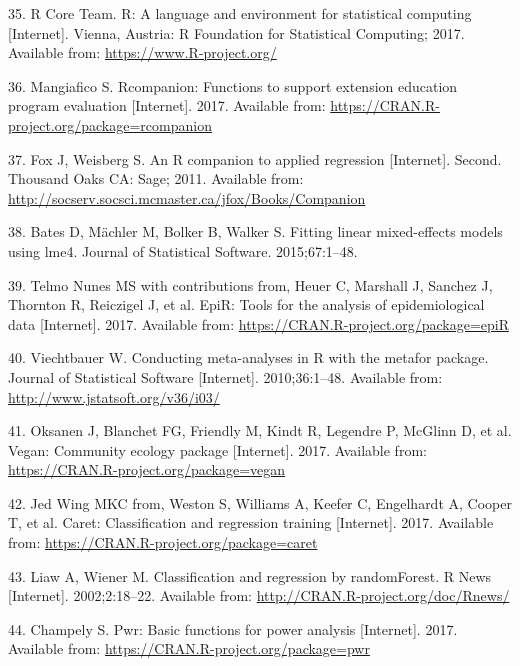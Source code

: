 \documentclass[12pt,]{article}
\begin{document}
\hypertarget{ref-r_citation_2017}{}
35. R Core Team. R: A language and environment for statistical computing
{[}Internet{]}. Vienna, Austria: R Foundation for Statistical Computing;
2017. Available from: \url{https://www.R-project.org/}

\hypertarget{ref-rcompanion_citation_2017}{}
36. Mangiafico S. Rcompanion: Functions to support extension education
program evaluation {[}Internet{]}. 2017. Available from:
\url{https://CRAN.R-project.org/package=rcompanion}

\hypertarget{ref-car_citation_2011}{}
37. Fox J, Weisberg S. An R companion to applied regression
{[}Internet{]}. Second. Thousand Oaks CA: Sage; 2011. Available from:
\url{http://socserv.socsci.mcmaster.ca/jfox/Books/Companion}

\hypertarget{ref-lme4_citation_2015}{}
38. Bates D, Mächler M, Bolker B, Walker S. Fitting linear mixed-effects
models using lme4. Journal of Statistical Software. 2015;67:1--48.

\hypertarget{ref-epir_citation_2017}{}
39. Telmo Nunes MS with contributions from, Heuer C, Marshall J, Sanchez
J, Thornton R, Reiczigel J, et al. EpiR: Tools for the analysis of
epidemiological data {[}Internet{]}. 2017. Available from:
\url{https://CRAN.R-project.org/package=epiR}

\hypertarget{ref-metafor_citation_2010}{}
40. Viechtbauer W. Conducting meta-analyses in R with the metafor
package. Journal of Statistical Software {[}Internet{]}. 2010;36:1--48.
Available from: \url{http://www.jstatsoft.org/v36/i03/}

\hypertarget{ref-vegan_citation_2017}{}
41. Oksanen J, Blanchet FG, Friendly M, Kindt R, Legendre P, McGlinn D,
et al. Vegan: Community ecology package {[}Internet{]}. 2017. Available
from: \url{https://CRAN.R-project.org/package=vegan}

\hypertarget{ref-caret_citation_2017}{}
42. Jed Wing MKC from, Weston S, Williams A, Keefer C, Engelhardt A,
Cooper T, et al. Caret: Classification and regression training
{[}Internet{]}. 2017. Available from:
\url{https://CRAN.R-project.org/package=caret}

\hypertarget{ref-randomforest_citation_2002}{}
43. Liaw A, Wiener M. Classification and regression by randomForest. R
News {[}Internet{]}. 2002;2:18--22. Available from:
\url{http://CRAN.R-project.org/doc/Rnews/}

\hypertarget{ref-pwr_citation_2017}{}
44. Champely S. Pwr: Basic functions for power analysis {[}Internet{]}.
2017. Available from: \url{https://CRAN.R-project.org/package=pwr}
\end{document}
